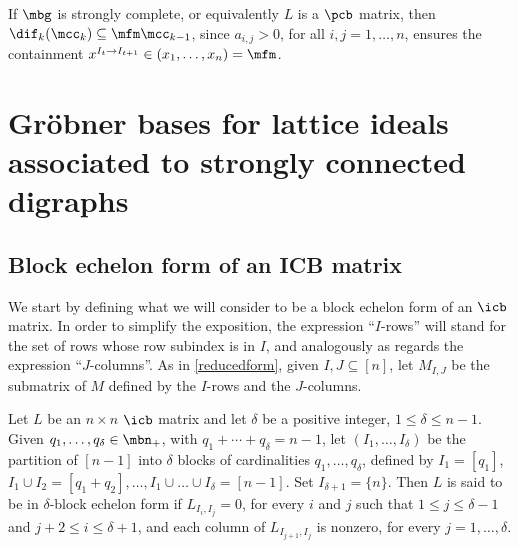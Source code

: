 \begin{remark}\label{dif-m}
If $\mbg$ is strongly complete, or equivalently $L$ is a $\pcb$
matrix, then $\dif_k(\mcc_k)\subseteq \mfm\mcc_{k-1}$, since
$a_{i,j}>0$, for all $i,j=1,\ldots ,n$, ensures the containment
$x^{I_t\to I_{t+1}}\in (x_1,\ldots ,x_n)=\mfm$.
\end{remark}

\section{Gr\"obner bases for lattice ideals associated to 
strongly connected digraphs}

\subsection{Block echelon form of an ICB matrix}\label{block-icb}

 We start by defining what we will consider to be a block
echelon form of an $\icb$ matrix. In order to simplify the exposition,
the expression ``$I$-rows'' will stand for the set of rows whose row
subindex is in $I$, and analogously as regards the expression
``$J$-columns''. As in \eqref{reducedform}, given $I,J\subseteq [n]$,
let $M_{I,J}$ be the submatrix of $M$ defined by the $I$-rows and the
$J$-columns.

\begin{definition}\label{def-echelon}
Let $L$ be an $n\times n$ $\icb$ matrix and let $\delta$ be a positive
integer, $1\leq \delta\leq n-1$. Given $q_1,\ldots ,q_\delta\in
\mbn_+$, with $q_1+\cdots+q_\delta=n-1$, let $(I_1,\ldots ,I_\delta)$
be the partition of $[n-1]$ into $\delta$ blocks of cardinalities
$q_1,\ldots ,q_\delta$, defined by $I_1=[q_1]$, $I_1\cup
I_2=[q_1+q_2],\ldots ,I_1\cup\ldots\cup I_\delta=[n-1]$.  Set
$I_{\delta+1}=\{n\}$. Then $L$ is said to be in $\delta$-block echelon
form if $L_{I_{i},I_{j}}=0$, for every $i$ and $j$ such that $1\leq
j\leq \delta-1$ and $j+2\leq i\leq \delta+1$, and each column of
$L_{I_{j+1},I_j}$ is nonzero, for every $j=1,\ldots ,\delta$.
\end{definition}

